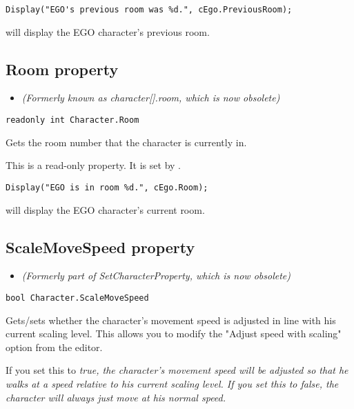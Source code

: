 \begin{verbatim}
Display("EGO's previous room was %d.", cEgo.PreviousRoom);
\end{verbatim}
will display the EGO character's previous room.


\subsection{Room property}\label{Character.Room}%

\begin{itemize}
\item \it{(Formerly known as character[].room, which is now obsolete)}
\end{itemize}

\begin{verbatim}
readonly int Character.Room
\end{verbatim}
Gets the room number that the character is currently in.

This is a read-only property. It is set by .

\begin{verbatim}
Display("EGO is in room %d.", cEgo.Room);
\end{verbatim}
will display the EGO character's current room.


\subsection{ScaleMoveSpeed property}\label{Character.ScaleMoveSpeed}%

\begin{itemize}
\item \it{(Formerly part of SetCharacterProperty, which is now obsolete)}
\end{itemize}

\begin{verbatim}
bool Character.ScaleMoveSpeed
\end{verbatim}
Gets/sets whether the character's movement speed is adjusted in line with his
current scaling level. This allows you to modify the "Adjust speed with scaling" option
from the editor.

If you set this to \it{true}, the character's movement speed will be adjusted so that he walks
at a speed relative to his current scaling level. If you set this to \it{false}, the character
will always just move at his normal speed.


